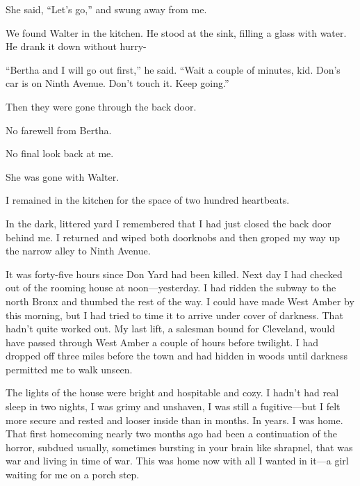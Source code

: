 \documentclass{novel}
\begin{document}
She said, “Let’s go,” and swung away from me.

We found Walter in the kitchen. He stood at the sink, filling a glass with water. He drank it down without hurry-

“Bertha and I will go out first,” he said. “Wait a couple of minutes, kid. Don’s car is on Ninth Avenue. Don’t touch it. Keep going.”

Then they were gone through the back door.

No farewell from Bertha.

No final look back at me.

She was gone with Walter.

I remained in the kitchen for the space of two hundred heartbeats.

In the dark, littered yard I remembered that I had just closed the back door behind me. I returned and wiped both doorknobs and then groped my way up the narrow alley to Ninth Avenue.

\vspace{2\nbs}
\clearpage
\thispagestyle{empty}
\begin{ChapterStart}
\vspace{3\nbs}
\end{ChapterStart}

It was forty-five hours since Don Yard had been killed. Next day I had checked out of the rooming house at noon—yesterday. I had ridden the subway to the north Bronx and thumbed the rest of the way. I could have made West Amber by this morning, but I had tried to time it to arrive under cover of darkness. That hadn’t quite worked out. My last lift, a salesman bound for Cleveland, would have passed through West Amber a couple of hours before twilight. I had dropped off three miles before the town and had hidden in woods until darkness permitted me to walk unseen.

The lights of the house were bright and hospitable and cozy. I hadn’t had real sleep in two nights, I was grimy and unshaven, I was still a fugitive—but I felt more secure and rested and looser inside than in months. In years. I was home. That first homecoming nearly two months ago had been a continuation of the horror, subdued usually, sometimes bursting in your brain like shrapnel, that was war and living in time of war. This was home now with all I wanted in it—a girl waiting for me on a porch step.
\end{document}
